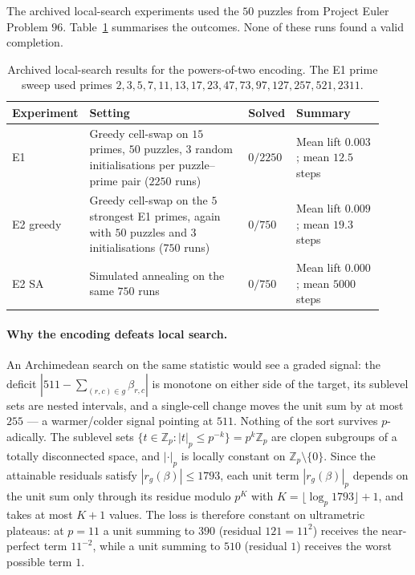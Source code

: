 \documentclass[11pt]{article}
\begin{document}
The archived local-search experiments used the \(50\) puzzles from Project Euler Problem \(96\). Table~\ref{tab:powers-two-results} summarises the outcomes. None of these runs found a valid completion.

\begin{table}[H]
\centering
\small
\begin{tabular}{@{}p{0.14\linewidth}p{0.44\linewidth}p{0.10\linewidth}p{0.24\linewidth}@{}}
\toprule
Experiment & Setting & Solved & Summary \\
\midrule
E1 & Greedy cell-swap on \(15\) primes, \(50\) puzzles, \(3\) random initialisations per puzzle--prime pair (\(2250\) runs) & \(0/2250\) & Mean lift \(0.003\); mean \(12.5\) steps \\
E2 greedy & Greedy cell-swap on the \(5\) strongest E1 primes, again with \(50\) puzzles and \(3\) initialisations (\(750\) runs) & \(0/750\) & Mean lift \(0.009\); mean \(19.3\) steps \\
E2 SA & Simulated annealing on the same \(750\) runs & \(0/750\) & Mean lift \(0.000\); mean \(5000\) steps \\
\bottomrule
\end{tabular}
\caption{Archived local-search results for the powers-of-two encoding. The E1 prime sweep used primes \(2,3,5,7,11,13,17,23,47,73,97,127,257,521,2311\).}
\label{tab:powers-two-results}
\end{table}


\paragraph{Why the encoding defeats local search.}
An Archimedean search on the same statistic would see a graded
signal: the deficit $|511 - \sum_{(r,c)\in g}\beta_{r,c}|$ is monotone on
either side of the target, its sublevel sets are nested intervals, and a
single-cell change moves the unit sum by at most $255$ --- a
warmer/colder signal pointing at $511$. Nothing of the sort survives
$p$-adically. The sublevel sets
$\{t \in \mathbb{Z}_p : |t|_p \le p^{-k}\} = p^k\mathbb{Z}_p$ are clopen
subgroups of a totally disconnected space, and $|\cdot|_p$ is locally
constant on $\mathbb{Z}_p \setminus \{0\}$. Since the attainable residuals
satisfy $|r_g(\beta)| \le 1793$, each unit term $|r_g(\beta)|_p$ depends on
the unit sum only through its residue modulo $p^{K}$ with
$K = \lfloor \log_p 1793 \rfloor + 1$, and takes at most $K+1$ values. The
loss is therefore constant on ultrametric plateaus:
at $p=11$ a unit summing to $390$ (residual $121 = 11^2$) receives the
near-perfect term $11^{-2}$, while a unit summing to $510$ (residual $1$)
receives the worst possible term $1$.
\end{document}
